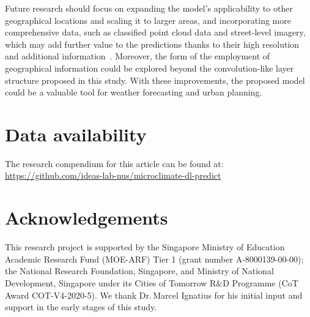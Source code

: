 \documentclass[a4paper,fleqn]{cas-sc}
\begin{document}
Future research should focus on expanding the model's applicability to other geographical locations and scaling it to larger areas, and incorporating more comprehensive data, such as classified point cloud data and street-level imagery, which may add further value to the predictions thanks to their high resolution and additional information~\citep{Megahed2021,2023_jag_svi_sensitivity}. Moreover, the form of the employment of geographical information could be explored beyond the convolution-like layer structure proposed in this study. With these improvements, the proposed model could be a valuable tool for weather forecasting and urban planning.

\section*{Data availability}
\noindent The research compendium for this article can be found at:\\\url{https://github.com/ideas-lab-nus/microclimate-dl-predict}

\section*{Acknowledgements}

This research project is supported by the Singapore Ministry of Education Academic Research Fund (MOE-ARF) Tier 1 (grant number A-8000139-00-00); the National Research Foundation, Singapore, and Ministry of National Development, Singapore under its Cities of Tomorrow R\&D Programme (CoT Award COT-V4-2020-5). We thank Dr.\,Marcel Ignatius for his initial input and support in the early stages of this study. 


\printcredits

% 







\end{document}
